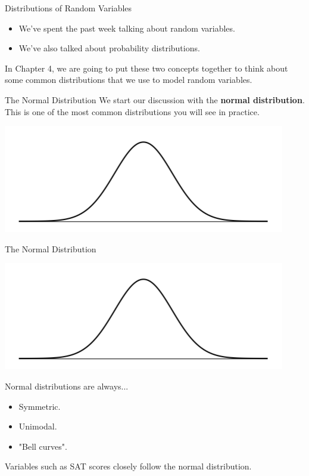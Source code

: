 \begin{frame}{Distributions of Random Variables}
    \begin{itemize}
        \item We've spent the past week talking about random variables.
        \item We've also talked about probability distributions.
    \end{itemize}
    \vspace{12pt}In Chapter 4, we are going to put these two concepts together to think about some common distributions that we use to model random variables.
\end{frame}

\begin{frame}{The Normal Distribution}
    We start our discussion with the \textbf{normal distribution}. This is one of the most common distributions you will see in practice.
    
    \begin{center}
        \includegraphics[scale=0.5]{images/normalcurve.png}
    \end{center}
\end{frame}

\begin{frame}{The Normal Distribution}
    \begin{center}
        \includegraphics[scale=0.5]{images/normalcurve.png}
    \end{center}
    
    Normal distributions are always...
    \begin{itemize}
        \item Symmetric.
        \item Unimodal.
        \item "Bell curves".
    \end{itemize}

    Variables such as SAT scores closely follow the normal distribution.
\end{frame}

